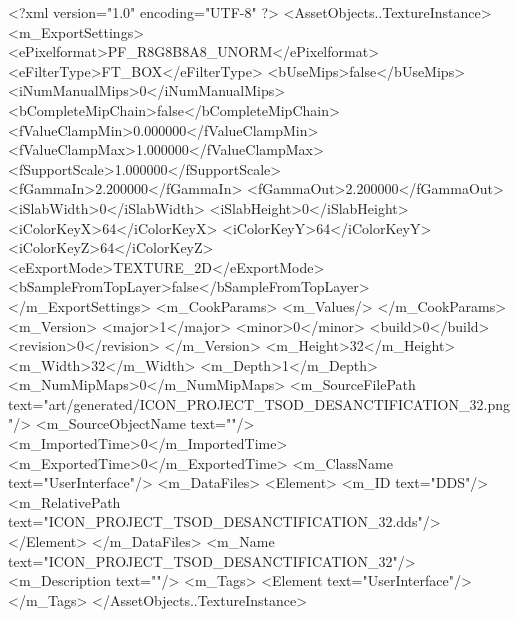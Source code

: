 <?xml version="1.0" encoding="UTF-8" ?>
<AssetObjects..TextureInstance>
	<m_ExportSettings>
		<ePixelformat>PF_R8G8B8A8_UNORM</ePixelformat>
		<eFilterType>FT_BOX</eFilterType>
		<bUseMips>false</bUseMips>
		<iNumManualMips>0</iNumManualMips>
		<bCompleteMipChain>false</bCompleteMipChain>
		<fValueClampMin>0.000000</fValueClampMin>
		<fValueClampMax>1.000000</fValueClampMax>
		<fSupportScale>1.000000</fSupportScale>
		<fGammaIn>2.200000</fGammaIn>
		<fGammaOut>2.200000</fGammaOut>
		<iSlabWidth>0</iSlabWidth>
		<iSlabHeight>0</iSlabHeight>
		<iColorKeyX>64</iColorKeyX>
		<iColorKeyY>64</iColorKeyY>
		<iColorKeyZ>64</iColorKeyZ>
		<eExportMode>TEXTURE_2D</eExportMode>
		<bSampleFromTopLayer>false</bSampleFromTopLayer>
	</m_ExportSettings>
	<m_CookParams>
		<m_Values/>
	</m_CookParams>
	<m_Version>
		<major>1</major>
		<minor>0</minor>
		<build>0</build>
		<revision>0</revision>
	</m_Version>
	<m_Height>32</m_Height>
	<m_Width>32</m_Width>
	<m_Depth>1</m_Depth>
	<m_NumMipMaps>0</m_NumMipMaps>
	<m_SourceFilePath text="art/generated/ICON_PROJECT_TSOD_DESANCTIFICATION_32.png"/>
	<m_SourceObjectName text=""/>
	<m_ImportedTime>0</m_ImportedTime>
	<m_ExportedTime>0</m_ExportedTime>
	<m_ClassName text="UserInterface"/>
	<m_DataFiles>
		<Element>
			<m_ID text="DDS"/>
			<m_RelativePath text="ICON_PROJECT_TSOD_DESANCTIFICATION_32.dds"/>
		</Element>
	</m_DataFiles>
	<m_Name text="ICON_PROJECT_TSOD_DESANCTIFICATION_32"/>
	<m_Description text=""/>
	<m_Tags>
		<Element text="UserInterface"/>
	</m_Tags>
</AssetObjects..TextureInstance>
